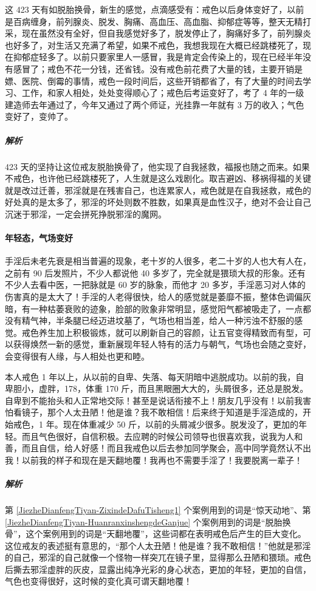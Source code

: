 \begin{case}\label{JiezheDianfengTiyan-HuanranxinshengdeGanjue}
    这 423 天有如脱胎换骨，新生的感觉，点滴感受有：戒色以后身体变好了，以前是百病缠身，前列腺炎、脱发、胸痛、高血压、高血脂、抑郁症等等，整天无精打采，现在虽然没有全好，但自我感觉好多了，脱发停止了，胸痛好多了，前列腺炎也好多了，对生活又充满了希望，如果不戒色，我想我现在大概已经跳楼死了，现在抑郁症轻多了。以前只要家里人一感冒，我是肯定会传染上的，现在已经半年没有感冒了；戒色不花一分钱，还省钱。没有戒色前花费了大量的钱，主要开销是嫖、医院、倒霉的事情，戒色一段时间后，这些开销都省了，有了大量的时间去学习、工作，和家人相处，处处变得顺心了；戒色后考运变好了，考了 4 年的一级建造师去年通过了，今年又通过了两个师证，光挂靠一年就有 3 万的收入；气色变好了，变帅了。
    \subparagraph{解析} 423 天的坚持让这位戒友脱胎换骨了，他实现了自我拯救，福报也随之而来。如果不戒色，也许他已经跳楼死了，人生就是这么戏剧化。取吉避凶、移祸得福的关键就是改过迁善，邪淫就是在残害自己，也连累家人，戒色就是在自我拯救，戒色的好处真的是太多了，邪淫的坏处则数不胜数，如果真是血性汉子，绝对不会让自己沉迷于邪淫，一定会拼死挣脱邪淫的魔网。
\end{case}

\paragraph{年轻态，气场变好}

手淫后未老先衰是相当普遍的现象，老十岁的人很多，老二十岁的人也大有人在，之前有 90 后发照片，不少人都说他 40 多岁了，完全就是猥琐大叔的形象。还有不少人去看中医，一把脉就是 60 岁的脉象，而他才 20 多岁，手淫恶习对人体的伤害真的是太大了！手淫的人老得很快，给人的感觉就是萎靡不振，整体色调偏灰暗，有一种枯萎衰败的迹象，脸部的败象非常明显，感觉阳气都被吸走了，一点都没有精气神，半条腿已经迈进坟墓了，气场也相当差，给人一种污浊不舒服的感觉。戒色养生加上积极锻炼，就可以刷新自己的容颜，让五官变得精致而有型，可以获得焕然一新的感觉，重新展现年轻人特有的活力与朝气，气场也会随之变好，会变得很有人缘，与人相处也更和睦。

\begin{case}
    本人戒色 1 年以上，从以前的自卑、失落、每天阴暗中逃脱成功。以前的我，自卑胆小，虚胖，178，体重 170 斤，而且黑眼圈大大的，头屑很多，还总是脱发。自卑到不能抬头和人正常地交际！甚至是说话衔接不上！朋友几乎没有！以前我害怕看镜子，那个人太丑陋！他是谁？我不敢相信！后来终于知道是手淫造成的，开始戒色，1 年。现在体重减少 50 斤，以前的头屑减少很多。脱发没了，更加的年轻。而且气色很好，自信积极。去应聘的时候公司领导也很喜欢我，说我为人和善，而且自信，给人好感！而且我戒色以后去参加同学聚会，高中同学竟然认不出我！以前我的样子和现在是天翻地覆！我再也不需要手淫了！我要脱离一辈子！
    \subparagraph{解析} 第 \ref{JiezheDianfengTiyan-ZixindeDafuTisheng1} 个案例用到的词是“惊天动地”、第 \ref{JiezheDianfengTiyan-HuanranxinshengdeGanjue} 个案例用到的词是“脱胎换骨”，这个案例用到的词是“天翻地覆”，这些词都在表明戒色后产生的巨大变化。这位戒友的表述挺有意思的，“那个人太丑陋！他是谁？我不敢相信！”他就是邪淫的自己，邪淫的自己就像一个怪物一样突兀在镜子里，显得那么丑陋和猥琐。戒色后撕去邪淫虚胖的灰皮，显露出纯净光彩的身心状态，更加的年轻，更加的自信，气色也变得很好，这时候的变化真可谓天翻地覆！
\end{case}

